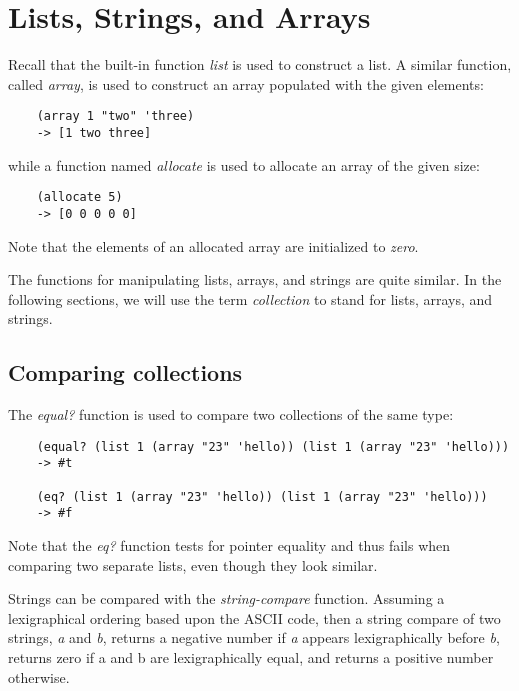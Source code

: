 \chapter{Lists, Strings, and Arrays}
\label{ListsStringsArrays}

Recall that the built-in function {\it list} is used to construct a list.
A similar function, called {\it array}, is used to construct an array populated
with the given elements:

\begin{verbatim}
    (array 1 "two" 'three)
    -> [1 two three]
\end{verbatim}

while a function named {\it allocate} is used to allocate an array
of the given size:

\begin{verbatim}
    (allocate 5)
    -> [0 0 0 0 0]
\end{verbatim}

Note that the elements of an allocated array are initialized to {\it zero}.

The functions for manipulating lists, arrays, and strings are quite
similar. In the following sections, we will use the term {\it collection}
to stand for lists, arrays, and strings.

\section{Comparing collections}

The {\it equal?} function is used to compare two collections of the same type:

\begin{verbatim}
    (equal? (list 1 (array "23" 'hello)) (list 1 (array "23" 'hello)))
    -> #t

    (eq? (list 1 (array "23" 'hello)) (list 1 (array "23" 'hello)))
    -> #f
\end{verbatim}

Note that the {\it eq?} function tests for pointer equality and thus fails
when comparing two separate lists, even though they look similar.

Strings can be compared with the {\it string-compare} function.
Assuming a lexigraphical ordering based upon the ASCII code,
then a string compare of two strings, {\it a} and {\it b},
returns a negative number if {\it a}
appears lexigraphically before {\it b}, returns zero if a and
b are lexigraphically equal,
and returns a positive number otherwise.

